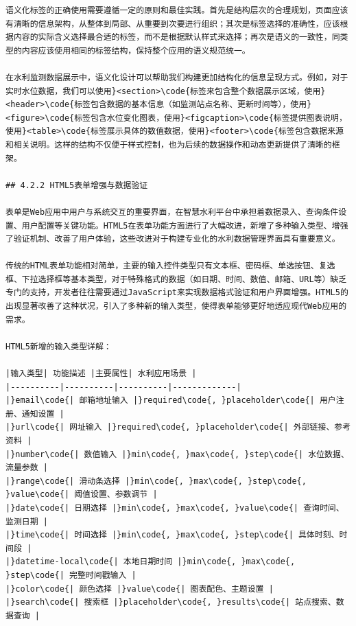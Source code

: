 \begin{lstlisting}
语义化标签的正确使用需要遵循一定的原则和最佳实践。首先是结构层次的合理规划，页面应该有清晰的信息架构，从整体到局部、从重要到次要进行组织；其次是标签选择的准确性，应该根据内容的实际含义选择最合适的标签，而不是根据默认样式来选择；再次是语义的一致性，同类型的内容应该使用相同的标签结构，保持整个应用的语义规范统一。

在水利监测数据展示中，语义化设计可以帮助我们构建更加结构化的信息呈现方式。例如，对于实时水位数据，我们可以使用}<section>\code{标签来包含整个数据展示区域，使用}<header>\code{标签包含数据的基本信息（如监测站点名称、更新时间等），使用}<figure>\code{标签包含水位变化图表，使用}<figcaption>\code{标签提供图表说明，使用}<table>\code{标签展示具体的数值数据，使用}<footer>\code{标签包含数据来源和相关说明。这样的结构不仅便于样式控制，也为后续的数据操作和动态更新提供了清晰的框架。

## 4.2.2 HTML5表单增强与数据验证

表单是Web应用中用户与系统交互的重要界面，在智慧水利平台中承担着数据录入、查询条件设置、用户配置等关键功能。HTML5在表单功能方面进行了大幅改进，新增了多种输入类型、增强了验证机制、改善了用户体验，这些改进对于构建专业化的水利数据管理界面具有重要意义。

传统的HTML表单功能相对简单，主要的输入控件类型只有文本框、密码框、单选按钮、复选框、下拉选择框等基本类型，对于特殊格式的数据（如日期、时间、数值、邮箱、URL等）缺乏专门的支持，开发者往往需要通过JavaScript来实现数据格式验证和用户界面增强。HTML5的出现显著改善了这种状况，引入了多种新的输入类型，使得表单能够更好地适应现代Web应用的需求。

HTML5新增的输入类型详解：

|输入类型| 功能描述 |主要属性| 水利应用场景 |
|----------|----------|----------|-------------|
|}email\code{| 邮箱地址输入 |}required\code{, }placeholder\code{| 用户注册、通知设置 |
|}url\code{| 网址输入 |}required\code{, }placeholder\code{| 外部链接、参考资料 |
|}number\code{| 数值输入 |}min\code{, }max\code{, }step\code{| 水位数据、流量参数 |
|}range\code{| 滑动条选择 |}min\code{, }max\code{, }step\code{, }value\code{| 阈值设置、参数调节 |
|}date\code{| 日期选择 |}min\code{, }max\code{, }value\code{| 查询时间、监测日期 |
|}time\code{| 时间选择 |}min\code{, }max\code{, }step\code{| 具体时刻、时间段 |
|}datetime-local\code{| 本地日期时间 |}min\code{, }max\code{, }step\code{| 完整时间戳输入 |
|}color\code{| 颜色选择 |}value\code{| 图表配色、主题设置 |
|}search\code{| 搜索框 |}placeholder\code{, }results\code{| 站点搜索、数据查询 |


\end{lstlisting}
